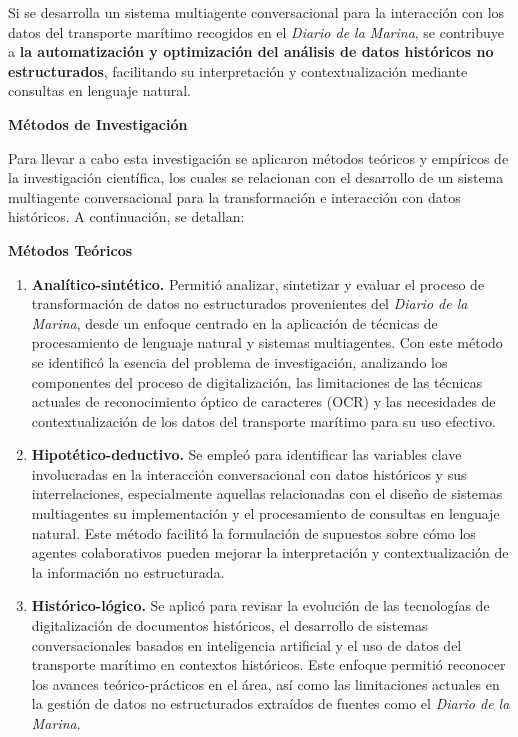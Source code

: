 Si se desarrolla un sistema multiagente conversacional para la interacción con los datos del transporte marítimo recogidos en el \textit{Diario de la Marina}, se contribuye a \textbf{la automatización y optimización del análisis de datos históricos no estructurados}, facilitando su interpretación y contextualización mediante consultas en lenguaje natural.

\textbf{Métodos de Investigación}

Para llevar a cabo esta investigación se aplicaron métodos teóricos y empíricos de la investigación científica, los cuales se relacionan con el desarrollo de un sistema multiagente conversacional para la transformación e interacción con datos históricos. A continuación, se detallan:

\textbf{Métodos Teóricos}

\begin{enumerate}
	\item \textbf{Analítico-sintético.} Permitió analizar, sintetizar y evaluar el proceso de transformación de datos no estructurados provenientes del \textit{Diario de la Marina}, desde un enfoque centrado en la aplicación de técnicas de procesamiento de lenguaje natural y sistemas multiagentes. Con este método se identificó la esencia del problema de investigación, analizando los componentes del proceso de digitalización, las limitaciones de las técnicas actuales de reconocimiento óptico de caracteres (OCR) y las necesidades de contextualización de los datos del transporte marítimo para su uso efectivo.
	
	\item \textbf{Hipotético-deductivo.} Se empleó para identificar las variables clave involucradas en la interacción conversacional con datos históricos y sus interrelaciones, especialmente aquellas relacionadas con el diseño de sistemas multiagentes su implementación y el procesamiento de consultas en lenguaje natural. Este método facilitó la formulación de supuestos sobre cómo los agentes colaborativos pueden mejorar la interpretación y contextualización de la información no estructurada.
	
	\item \textbf{Histórico-lógico.} Se aplicó para revisar la evolución de las tecnologías de digitalización de documentos históricos, el desarrollo de sistemas conversacionales basados en inteligencia artificial y el uso de datos del transporte marítimo en contextos históricos. Este enfoque permitió reconocer los avances teórico-prácticos en el área, así como las limitaciones actuales en la gestión de datos no estructurados extraídos de fuentes como el \textit{Diario de la Marina}.
\end{enumerate}

